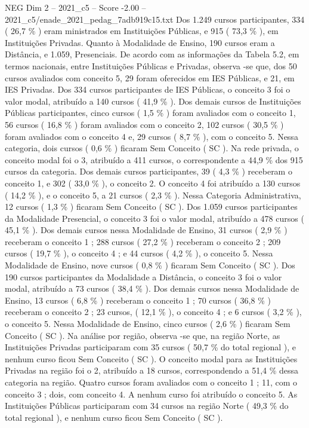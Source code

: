\begin{textsample}{NEG Dim 2 – 2021\_c5 – Score -2.00 – 2021\_c5/enade\_2021\_pedag\_7adb919c15.txt}
Dos 1.249 cursos participantes, 334 ( 26,7 \% ) eram ministrados em Instituições Públicas, e 915 ( 73,3 \% ), em Instituições Privadas.
Quanto à Modalidade de Ensino, 190 cursos eram a Distância, e 1.059, Presenciais.
De acordo com as informações da Tabela 5.2, em termos nacionais, entre Instituições Públicas e Privadas, observa -se que, dos 50 cursos avaliados com conceito 5, 29 foram oferecidos em IES Públicas, e 21, em IES Privadas.
Dos 334 cursos participantes de IES Públicas, o conceito 3 foi o valor modal, atribuído a 140 cursos ( 41,9 \% ).
Dos demais cursos de Instituições Públicas participantes, cinco cursos ( 1,5 \% ) foram avaliados com o conceito 1, 56 cursos ( 16,8 \% ) foram avaliados com o conceito 2, 102 cursos ( 30,5 \% ) foram avaliados com o conceito 4 e, 29 cursos ( 8,7 \% ), com o conceito 5.
Nessa categoria, dois cursos ( 0,6 \% ) ficaram Sem Conceito ( SC ).
Na rede privada, o conceito modal foi o 3, atribuído a 411 cursos, o correspondente a 44,9 \% dos 915 cursos da categoria.
Dos demais cursos participantes, 39 ( 4,3 \% ) receberam o conceito 1, e 302 ( 33,0 \% ), o conceito 2.
O conceito 4 foi atribuído a 130 cursos ( 14,2 \% ), e o conceito 5, a 21 cursos ( 2,3 \% ).
Nessa Categoria Administrativa, 12 cursos ( 1,3 \% ) ficaram Sem Conceito ( SC ).
Dos 1.059 cursos participantes da Modalidade Presencial, o conceito 3 foi o valor modal, atribuído a 478 cursos ( 45,1 \% ).
Dos demais cursos nessa Modalidade de Ensino, 31 cursos ( 2,9 \% ) receberam o conceito 1 ; 288 cursos ( 27,2 \% ) receberam o conceito 2 ; 209 cursos ( 19,7 \% ), o conceito 4 ; e 44 cursos ( 4,2 \% ), o conceito 5.
Nessa Modalidade de Ensino, nove cursos ( 0,8 \% ) ficaram Sem Conceito ( SC ).
Dos 190 cursos participantes da Modalidade a Distância, o conceito 3 foi o valor modal, atribuído a 73 cursos ( 38,4 \% ).
Dos demais cursos nessa Modalidade de Ensino, 13 cursos ( 6,8 \% ) receberam o conceito 1 ; 70 cursos ( 36,8 \% ) receberam o conceito 2 ; 23 cursos, ( 12,1 \% ), o conceito 4 ; e 6 cursos ( 3,2 \% ), o conceito 5.
Nessa Modalidade de Ensino, cinco cursos ( 2,6 \% ) ficaram Sem Conceito ( SC ).
Na análise por região, observa -se que, na região Norte, as Instituições Privadas participaram com 35 cursos ( 50,7 \% do total regional ), e nenhum curso ficou Sem Conceito ( SC ).
O conceito modal para as Instituições Privadas na região foi o 2, atribuído a 18 cursos, correspondendo a 51,4 \% dessa categoria na região.
Quatro cursos foram avaliados com o conceito 1 ; 11, com o conceito 3 ; dois, com conceito 4.
A nenhum curso foi atribuído o conceito 5.
As Instituições Públicas participaram com 34 cursos na região Norte ( 49,3 \% do total regional ), e nenhum curso ficou Sem Conceito ( SC ).

\end{textsample}
